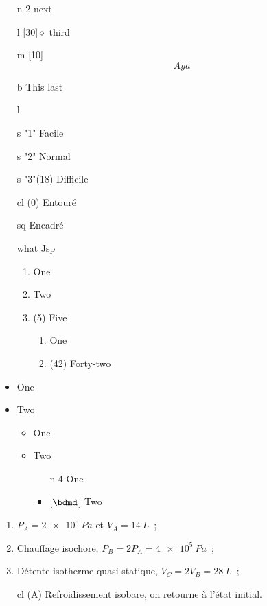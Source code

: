 \documentclass{book}
\begin{document}
\begin{enumerate}
	\item[n]{2} next
	\item[l][30]{$\diamond$} third
	\item[m][10]
	\[
		Aya
	\]
	\item[b]{This} last
	\item[l]{\iconimpo}
	\item[s]"1" Facile
	\item[s]"2" Normal
	\item[s]"3"(18) Difficile
	\item[cl](0) Entouré
	\item[sq] Encadré
	\item[what] Jsp
		\begin{enumerate}
			\item One
			\item Two
			      \item(5) Five
			      \begin{enumerate}
				      \item One
				            \item(42) Forty-two
			      \end{enumerate}
		\end{enumerate}
\end{enumerate}

\begin{itemize}
	\item One
	\item Two
	      \begin{itemize}
		      \item One
		      \item Two
		            \begin{itemize}
			            \item[n]{4} One
			            \item{}[$\bdmd$] Two
		            \end{itemize}
	      \end{itemize}
\end{itemize}
\begin{enumerate}[label=\clalphi]
	\item $P_A = \SI{2e5}{Pa}$ et $V_A = \SI{14}{L}$~;
	\item Chauffage isochore, $P_B = 2P_A = \SI{4e5}{Pa}$~;
	\item Détente isotherme quasi-statique, $V_C = 2V_B = \SI{28}{L}$~;
	      \item[cl](A) Refroidissement isobare, on retourne à l'état initial.
\end{enumerate}
\end{document}
